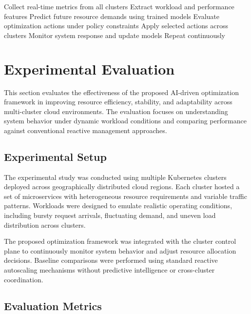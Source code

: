 \documentclass[conference]{IEEEtran}
\begin{document}
\begin{algorithm}[htbp]
\caption{AI-Driven Multi-Cluster Optimization}
\label{alg:optimization}
\begin{algorithmic}[1]
\STATE Collect real-time metrics from all clusters
\STATE Extract workload and performance features
\STATE Predict future resource demands using trained models
\STATE Evaluate optimization actions under policy constraints
\STATE Apply selected actions across clusters
\STATE Monitor system response and update models
\STATE Repeat continuously
\end{algorithmic}
\end{algorithm}

\section{Experimental Evaluation}

This section evaluates the effectiveness of the proposed AI-driven optimization framework in improving resource efficiency, stability, and adaptability across multi-cluster cloud environments. The evaluation focuses on understanding system behavior under dynamic workload conditions and comparing performance against conventional reactive management approaches.

\subsection{Experimental Setup}

The experimental study was conducted using multiple Kubernetes clusters deployed across geographically distributed cloud regions. Each cluster hosted a set of microservices with heterogeneous resource requirements and variable traffic patterns. Workloads were designed to emulate realistic operating conditions, including bursty request arrivals, fluctuating demand, and uneven load distribution across clusters.

The proposed optimization framework was integrated with the cluster control plane to continuously monitor system behavior and adjust resource allocation decisions. Baseline comparisons were performed using standard reactive autoscaling mechanisms without predictive intelligence or cross-cluster coordination.

\subsection{Evaluation Metrics}
\end{document}
